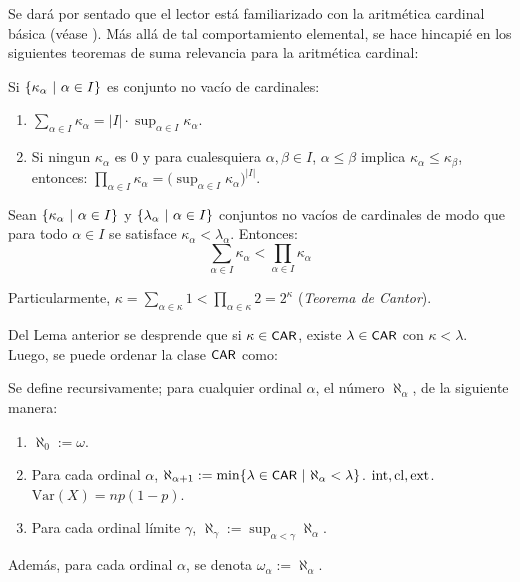     Se dará por sentado que el lector está familiarizado con la aritmética cardinal básica (véase \cite[Cap.~1, \S ~ 3]{jechSet}). Más allá de tal comportamiento elemental, se hace hincapié en los siguientes teoremas de suma relevancia para la aritmética cardinal:
    \begin{teorema}
        Si $\{\kappa_\alpha \text{ $|$ } \alpha \in I\}$ es conjunto no vacío de cardinales:
        \begin{enumerate}
            \item $\displaystyle \sum_{\alpha \in I} \kappa_\alpha = |I| \cdot \sup_{\alpha \in I} \kappa_\alpha$.
            \item Si ningun $\kappa_\alpha$ es $0$ y para cualesquiera $\alpha,\beta \in I$, $\alpha \leq \beta$ implica $\kappa_\alpha \leq \kappa_\beta$, entonces: $\displaystyle \prod_{\alpha \in I} \kappa_\alpha = \Big( \sup_{\alpha \in I} \kappa_\alpha \Big)^{|I|}$.
        \end{enumerate}
    \end{teorema}

    \begin{teorema}
        Sean $\{\kappa_\alpha \text{ $|$ } \alpha \in I\}$ y $\{\lambda_\alpha \text{ $|$ } \alpha \in I\}$ conjuntos no vacíos de cardinales de modo que para todo $\alpha \in I$ se satisface $\kappa_\alpha < \lambda_\alpha$. Entonces:
        \[ \sum_{\alpha \in I} \kappa_\alpha < \prod_{\alpha \in I} \kappa_\alpha \]

        Particularmente, $\kappa = \sum_{\alpha \in \kappa} 1 < \prod_{\alpha \in \kappa} 2 = 2^\kappa$ (\textit{Teorema de Cantor}).
    \end{teorema}

    Del Lema anterior se desprende que si $\kappa \in \text{\textsf{\small CAR}}$, existe $\lambda \in \text{\textsf{\small CAR}}$ con $\kappa < \lambda$. Luego, se puede ordenar la clase $\text{\textsf{\small CAR}}$ como:
    \begin{definicion}\index[sym]{$\aleph_\alpha$}\index[sym]{$\omega_\alpha$}
        Se define recursivamente; para cualquier ordinal $\alpha$, el número $\aleph_\alpha$, de la siguiente manera:
        \begin{enumerate}
            \item $\aleph_0:=\omega$.
            \item Para cada ordinal $\alpha$, $\aleph_{\alpha+1}:=\min\{ \lambda \in \text{\textsf{\small CAR}} \text{ $|$ } \aleph_\alpha < \lambda \}$. $\operatorname{int}, \operatorname{cl}, \operatorname{ext}$. $\mathrm{Var}(X) = np(1-p)$.
            \item Para cada ordinal límite $\gamma$, $\aleph_\gamma:=\sup_{\alpha < \gamma} \aleph_\alpha$.
        \end{enumerate}

        Además, para cada ordinal $\alpha$, se denota $\omega_\alpha:=\aleph_\alpha$.
    \end{definicion}
    
